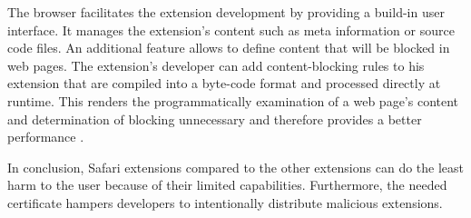 	The browser facilitates the extension development by providing a build-in user interface. It manages the extension's content such as meta information or source code files.	An additional feature allows to define content that will be blocked in web pages. The extension's developer can add content-blocking rules to his extension that are compiled into a byte-code format and processed directly at runtime. This renders the programmatically examination of a web page's content and determination of blocking unnecessary and therefore provides a better performance \cite{safariContentBlockingRules}.
	
	In conclusion, Safari extensions compared to the other extensions can do the least harm to the user because of their limited capabilities. Furthermore, the needed certificate hampers developers to intentionally distribute malicious extensions.